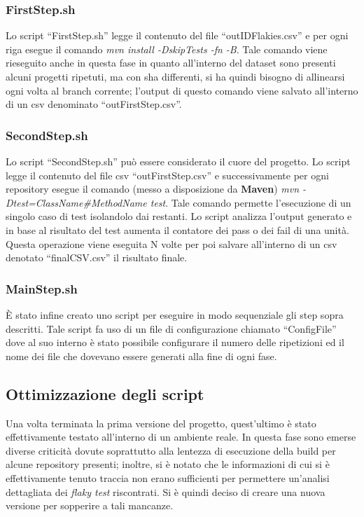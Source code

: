 \subsubsection{FirstStep.sh}
Lo script “FirstStep.sh” legge il contenuto del file “outIDFlakies.csv” e per ogni riga esegue il comando \emph{mvn install -DskipTests -fn -B}. Tale comando viene
rieseguito anche in questa fase in quanto all’interno del dataset sono presenti alcuni progetti ripetuti, ma con sha differenti, si ha quindi bisogno di allinearsi ogni volta al branch corrente; l’output di questo comando viene salvato all’interno di un csv denominato “outFirstStep.csv”.
\subsubsection{SecondStep.sh}
Lo script “SecondStep.sh” può essere considerato il cuore del progetto. Lo script legge il contenuto del file csv “outFirstStep.csv” e successivamente per ogni repository esegue il comando (messo a disposizione da \textbf{Maven}) \emph{mvn -
Dtest=ClassName\#MethodName test}.
Tale comando permette l’esecuzione di un singolo caso di test isolandolo dai restanti. Lo script analizza l’output generato e in 
base al risultato del test aumenta il contatore dei pass o dei fail di una unità. Questa
operazione viene eseguita N volte per poi salvare all’interno di un csv denotato “finalCSV.csv” il risultato finale.
\subsubsection{MainStep.sh}
È stato infine creato uno script per eseguire in modo sequenziale gli step sopra descritti. Tale script fa uso di un file di configurazione chiamato “ConfigFile” dove al suo interno è stato possibile configurare il numero delle ripetizioni ed il nome dei
file che dovevano essere generati alla fine di ogni fase.
\subsection{Ottimizzazione degli script}
Una volta terminata la prima versione del progetto, quest'ultimo è stato effettivamente testato all’interno di un ambiente reale. In questa fase sono emerse diverse criticità dovute soprattutto alla lentezza di esecuzione della build per alcune repository presenti; inoltre, si è notato che le informazioni di cui si è effettivamente
tenuto traccia non erano sufficienti per permettere un’analisi dettagliata dei \emph{flaky test} riscontrati. Si è quindi deciso di creare una nuova versione per sopperire a tali mancanze.
